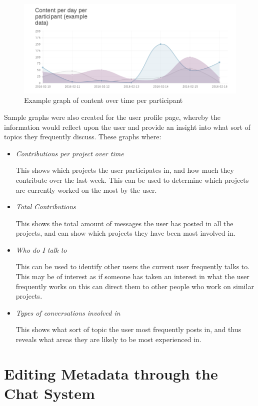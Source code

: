 \documentclass{l4proj}
\begin{document}
\begin{figure}[h]
\includegraphics[scale=0.75]{SampleGraph.png}
\centering
\caption{Example graph of content over time per participant}
\label{fig:4}

\end{figure}

\newpage
Sample graphs were also created for the user profile page, whereby the information would reflect upon the user and provide an insight into what sort of topics they frequently discuss. These graphs where:

\begin{itemize}
\item \textit{Contributions per project over time} 
\par This shows which projects the user participates in, and how much they contribute over the last week.  This can be used to determine which projects are currently worked on the most by the user.
\item \textit{Total Contributions}
\par This shows the total amount of messages the user has posted in all the projects, and can show which projects they have been most involved in.
\item \textit{Who do I talk to}
\par This can be used to identify other users the current user frequently talks to.  This may be of interest as if someone has taken an interest in what the user frequently works on this can direct them to other people who work on similar projects.
\item \textit{Types of conversations involved in}
\par This shows what sort of topic the user most frequently posts in, and thus reveals what areas they are likely to be most experienced in. 
\end{itemize}

\section{Editing Metadata through the Chat System}
\end{document}
